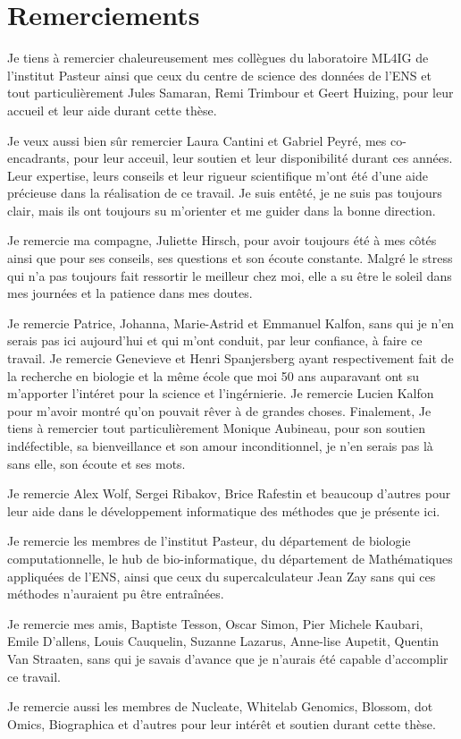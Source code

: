 \chapter*{Remerciements}

Je tiens à remercier chaleureusement mes collègues du laboratoire ML4IG de l'institut Pasteur ainsi que ceux du centre de science des données de l'ENS et tout particulièrement Jules Samaran, Remi Trimbour et Geert Huizing, pour leur accueil et leur aide durant cette thèse.

\bigskip

Je veux aussi bien sûr remercier Laura Cantini et Gabriel Peyré, mes co-encadrants, pour leur acceuil, leur soutien et leur disponibilité durant ces années. Leur expertise, leurs conseils et leur rigueur scientifique m'ont été d'une aide précieuse dans la réalisation de ce travail. Je suis entêté, je ne suis pas toujours clair, mais ils ont toujours su m'orienter et me guider dans la bonne direction.

\bigskip

Je remercie ma compagne, Juliette Hirsch, pour avoir toujours été à mes côtés ainsi que pour ses conseils, ses questions et son écoute constante. Malgré le stress qui n'a pas toujours fait ressortir le meilleur chez moi, elle a su être le soleil dans mes journées et la patience dans mes doutes.

\bigskip

Je remercie Patrice, Johanna, Marie-Astrid et Emmanuel Kalfon, sans qui je n'en serais pas ici aujourd'hui et qui m'ont conduit, par leur confiance, à faire ce travail. Je remercie Genevieve et Henri Spanjersberg ayant respectivement fait de la recherche en biologie et la même école que moi 50 ans auparavant ont su m'apporter l'intéret pour la science et l'ingérnierie. Je remercie Lucien Kalfon pour m'avoir montré qu'on pouvait rêver à de grandes choses. Finalement, Je tiens à remercier tout particulièrement Monique Aubineau, pour son soutien indéfectible, sa bienveillance et son amour inconditionnel, je n'en serais pas là sans elle, son écoute et ses mots.

\bigskip

Je remercie Alex Wolf, Sergei Ribakov, Brice Rafestin et beaucoup d'autres pour leur aide dans le développement informatique des méthodes que je présente ici.

\bigskip

Je remercie les membres de l'institut Pasteur, du département de biologie computationnelle, le hub de bio-informatique, du département de Mathématiques appliquées de l'ENS, ainsi que ceux du supercalculateur Jean Zay sans qui ces méthodes n'auraient pu être entraînées.

\bigskip

Je remercie mes amis, Baptiste Tesson, Oscar Simon, Pier Michele Kaubari, Emile D'allens, Louis Cauquelin, Suzanne Lazarus, Anne-lise Aupetit, Quentin Van Straaten, sans qui je savais d'avance que je n'aurais été capable d'accomplir ce travail.

\bigskip

Je remercie aussi les membres de Nucleate, Whitelab Genomics, Blossom, dot Omics, Biographica et d'autres pour leur intérêt et soutien durant cette thèse.